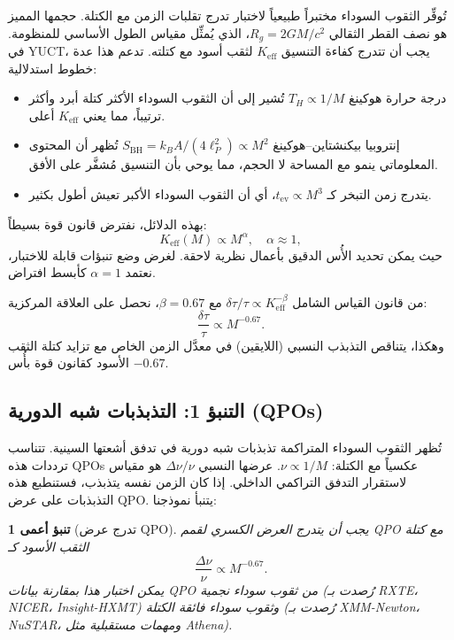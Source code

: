 \documentclass[11pt,a4paper]{article}
\newcommand{\Ke}{K_{\mathrm{eff}}}
\newtheorem{prediction}[theorem]{تنبؤ أعمى}
\begin{document}
	تُوفِّر الثقوب السوداء مختبراً طبيعياً لاختبار تدرج تقلبات الزمن مع الكتلة. حجمها المميز هو نصف القطر الثقالي \(R_g = 2GM/c^2\)، الذي يُمثِّل مقياس الطول الأساسي للمنظومة. في YUCT، يجب أن تتدرج كفاءة التنسيق \(\Ke\) لثقب أسود مع كتلته. تدعم هذا عدة خطوط استدلالية:
	\begin{itemize}
		\item درجة حرارة هوكينغ \(T_H \propto 1/M\) تُشير إلى أن الثقوب السوداء الأكثر كتلة أبرد وأكثر ترتيباً، مما يعني \(\Ke\) أعلى.
		\item إنتروبيا بيكنشتاين–هوكينغ \(S_{\text{BH}} = k_B A/(4\ell_P^2) \propto M^2\) تُظهر أن المحتوى المعلوماتي ينمو مع المساحة لا الحجم، مما يوحي بأن التنسيق مُشفَّر على الأفق.
		\item يتدرج زمن التبخر كـ \(t_{\text{ev}} \propto M^3\)، أي أن الثقوب السوداء الأكبر تعيش أطول بكثير.
	\end{itemize}
	بهذه الدلائل، نفترض قانون قوة بسيطاً:
	\begin{equation}
		\Ke(M) \propto M^{\alpha}, \quad \alpha \approx 1,
	\end{equation}
	حيث يمكن تحديد الأُس الدقيق بأعمال نظرية لاحقة. لغرض وضع تنبؤات قابلة للاختبار، نعتمد \(\alpha = 1\) كأبسط افتراض.
	
	من قانون القياس الشامل \(\delta \tau / \tau \propto \Ke^{-\beta}\) مع \(\beta = 0.67\)، نحصل على العلاقة المركزية:
	\begin{equation}
		\boxed{\frac{\delta \tau}{\tau} \propto M^{-0.67}}.
	\end{equation}
	وهكذا، يتناقص التذبذب النسبي (اللايقين) في معدَّل الزمن الخاص مع تزايد كتلة الثقب الأسود كقانون قوة بأُس \(-0.67\).
	
	\subsection{التنبؤ 1: التذبذبات شبه الدورية (QPOs)}
	
	تُظهر الثقوب السوداء المتراكمة تذبذبات شبه دورية في تدفق أشعتها السينية. تتناسب ترددات هذه QPOs عكسياً مع الكتلة: \(\nu \propto 1/M\). عرضها النسبي \(\Delta\nu/\nu\) هو مقياس لاستقرار التدفق التراكمي الداخلي. إذا كان الزمن نفسه يتذبذب، فستنطبع هذه التذبذبات على عرض QPO. يتنبأ نموذجنا:
	\begin{prediction}[تدرج عرض QPO]
		يجب أن يتدرج العرض الكسري لقمم QPO مع كتلة الثقب الأسود كـ
		\begin{equation}
			\frac{\Delta\nu}{\nu} \propto M^{-0.67}.
		\end{equation}
		يمكن اختبار هذا بمقارنة بيانات QPO من ثقوب سوداء نجمية (رُصدت بـ RXTE، NICER، Insight-HXMT) وثقوب سوداء فائقة الكتلة (رُصدت بـ XMM-Newton، NuSTAR، ومهمات مستقبلية مثل Athena).
	\end{prediction}
	
\end{document}
